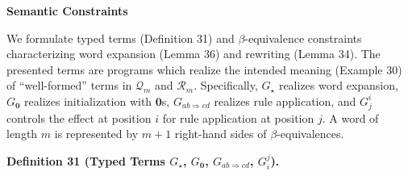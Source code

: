  
 
\par\medskip\noindent\textbf{Semantic Constraints}\par
 
 
We formulate typed terms (Definition 31) and $\beta$-equivalence constraints characterizing word expansion (Lemma 36) and rewriting (Lemma 34). The presented terms are programs which realize the intended meaning (Example 30) of “well-formed” terms in $\mathcal{Q}_{m}$ and $\mathcal{R}_{m}$. Specifically, $G_{\star}$ realizes word expansion, $G_{\mathbf{0}}$ realizes initialization with $\mathbf{0}$s, $G_{ab\Rightarrow cd}$ realizes rule application, and $G_{j}^{i}$ controls the effect at position $i$ for rule application at position $j$. A word of length $m$ is represented by $m+1$ right-hand sides of $\beta$-equivalences.\par
 
 
 
\par\medskip\noindent\textbf{Definition 31 (Typed Terms $G_{\star}$, $G_{\mathbf{0}}$, $G_{ab\Rightarrow cd}$, $G_{i}^{j}$).}\par
 
